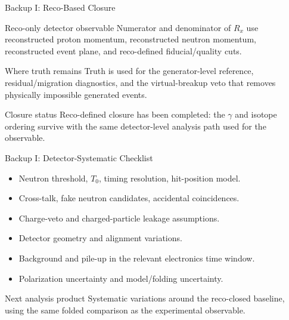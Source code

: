 \documentclass[aspectratio=169]{beamer}
\newcommand{\gpar}{\gamma}
\begin{document}
\begin{frame}{Backup I: Reco-Based Closure}
  \small
  \begin{block}{Reco-only detector observable}
    Numerator and denominator of $R_x$ use reconstructed proton momentum,
    reconstructed neutron momentum, reconstructed event plane, and
    reco-defined fiducial/quality cuts.
  \end{block}
  \begin{block}{Where truth remains}
    Truth is used for the generator-level reference, residual/migration
    diagnostics, and the virtual-breakup veto that removes physically
    impossible generated events.
  \end{block}
  \begin{block}{Closure status}
    Reco-defined closure has been completed: the $\gpar$ and isotope ordering
    survive with the same detector-level analysis path used for the observable.
  \end{block}
\end{frame}

\begin{frame}{Backup I: Detector-Systematic Checklist}
  \small
  \begin{itemize}
    \item Neutron threshold, $T_0$, timing resolution, hit-position model.
    \item Cross-talk, fake neutron candidates, accidental coincidences.
    \item Charge-veto and charged-particle leakage assumptions.
    \item Detector geometry and alignment variations.
    \item Background and pile-up in the relevant electronics time window.
    \item Polarization uncertainty and model/folding uncertainty.
  \end{itemize}
  \begin{block}{Next analysis product}
    \small Systematic variations around the reco-closed baseline, using the
    same folded comparison as the experimental observable.
  \end{block}
\end{frame}
\end{document}
